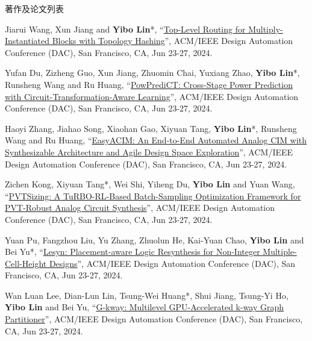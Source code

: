 \begin{rSection}{著作及论文列表}
\begin{description}[font=\normalfont, rightmargin=2em]
\item[{[C156]}]{
        Jiarui Wang, Xun Jiang and \textbf{Yibo Lin}*, 
    ``\href{https://doi.org/10.1145/3649329.3655900}{Top-Level Routing for Multiply-Instantiated Blocks with Topology Hashing}'', 
    ACM/IEEE Design Automation Conference (DAC), San Francisco, CA, Jun 23-27, 2024.
    
}
            

\item[{[C155]}]{
        Yufan Du, Zizheng Guo, Xun Jiang, Zhuomin Chai, Yuxiang Zhao, \textbf{Yibo Lin}*, Runsheng Wang and Ru Huang, 
    ``\href{https://doi.org/10.1145/3649329.3657349}{PowPrediCT: Cross-Stage Power Prediction with Circuit-Transformation-Aware Learning}'', 
    ACM/IEEE Design Automation Conference (DAC), San Francisco, CA, Jun 23-27, 2024.
    
}
            

\item[{[C154]}]{
        Haoyi Zhang, Jiahao Song, Xiaohan Gao, Xiyuan Tang, \textbf{Yibo Lin}*, Runsheng Wang and Ru Huang, 
    ``\href{https://doi.org/10.1145/3649329.3656229}{EasyACIM: An End-to-End Automated Analog CIM with Synthesizable Architecture and Agile Design Space Exploration}'', 
    ACM/IEEE Design Automation Conference (DAC), San Francisco, CA, Jun 23-27, 2024.
    
}
            

\item[{[C153]}]{
        Zichen Kong, Xiyuan Tang*, Wei Shi, Yiheng Du, \textbf{Yibo Lin} and Yuan Wang, 
    ``\href{https://doi.org/10.1145/3649329.3661850}{PVTSizing: A TuRBO-RL-Based Batch-Sampling Optimization Framework for PVT-Robust Analog Circuit Synthesis}'', 
    ACM/IEEE Design Automation Conference (DAC), San Francisco, CA, Jun 23-27, 2024.
    
}
            

\item[{[C152]}]{
        Yuan Pu, Fangzhou Liu, Yu Zhang, Zhuolun He, Kai-Yuan Chao, \textbf{Yibo Lin} and Bei Yu*, 
    ``\href{https://doi.org/10.1145/3649329.3656243}{Lesyn: Placement-aware Logic Resynthesis for Non-Integer Multiple-Cell-Height Designs}'', 
    ACM/IEEE Design Automation Conference (DAC), San Francisco, CA, Jun 23-27, 2024.
    
}
            

\item[{[C151]}]{
        Wan Luan Lee, Dian-Lun Lin, Tsung-Wei Huang*, Shui Jiang, Tsung-Yi Ho, \textbf{Yibo Lin} and Bei Yu, 
    ``\href{https://doi.org/10.1145/3649329.3656238}{G-kway: Multilevel GPU-Accelerated k-way Graph Partitioner}'', 
    ACM/IEEE Design Automation Conference (DAC), San Francisco, CA, Jun 23-27, 2024.
    
}
\end{description}
\end{rSection}
